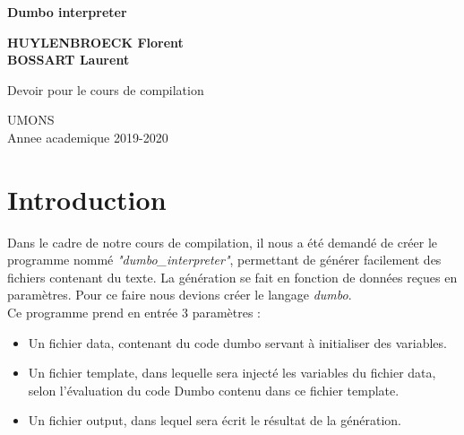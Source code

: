 \documentclass[11pt]{article}
\begin{document}
\begin{titlepage}
   \begin{center}
       \vspace*{1cm}

       \textbf{\huge Dumbo interpreter}

            
       \vspace{1.5cm}

       \textbf{HUYLENBROECK Florent\\
       			BOSSART Laurent}

       \vfill
            
       Devoir pour le cours de compilation\\
            
       \vspace{0.8cm}
            

       UMONS\\
       Annee academique 2019-2020
            
   \end{center}
\end{titlepage}
\newpage
\tableofcontents
\newpage
\section{Introduction}
Dans le cadre de notre cours de compilation, il nous a été demandé de créer le programme nommé \emph{"dumbo\_interpreter"}, permettant de générer facilement des fichiers contenant du texte. La génération se fait en fonction de données reçues en paramètres. Pour ce faire nous devions créer le langage \emph{dumbo}.\\
Ce programme prend en entrée 3 paramètres :
\begin{itemize}
\item Un fichier data, contenant du code dumbo servant à initialiser des variables.
\item Un fichier template, dans lequelle sera injecté les variables du fichier data, selon l'évaluation du code Dumbo contenu dans ce fichier template.
\item Un fichier output, dans lequel sera écrit le résultat de la génération.
\end{itemize}

\newpage
\end{document}

